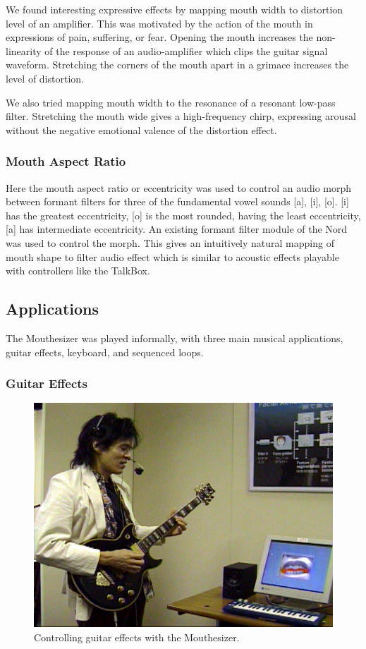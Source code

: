 We found interesting expressive effects by mapping mouth width to distortion level of an amplifier. This was motivated by the action of the mouth in expressions of pain, suffering, or fear. Opening the mouth increases the non-linearity of the response of an audio-amplifier which clips the guitar signal waveform. Stretching the corners of the mouth apart in a grimace increases the level of distortion.

We also tried mapping mouth width to the resonance of a resonant low-pass filter. Stretching the mouth wide gives a high-frequency chirp, expressing arousal without the negative emotional valence of the distortion effect.

\subsubsection{Mouth Aspect Ratio}

Here the mouth aspect ratio or eccentricity was used to control an audio morph between formant filters for three of the fundamental vowel sounds [a], [i], [o]. [i] has the greatest eccentricity, [o] is the most rounded, having the least eccentricity, [a] has intermediate eccentricity. An existing formant filter module of the Nord was used to control the morph. This gives an intuitively natural mapping of mouth shape to filter audio effect which is similar to acoustic effects playable with controllers like the TalkBox.

\subsection{Applications}

The Mouthesizer was played informally, with three main musical applications, guitar effects, keyboard, and sequenced loops.

\subsubsection{Guitar Effects}

\begin{figure}[t]
\centering
\includegraphics[width=\textwidth]{lyons_fig5}
\caption{Controlling guitar effects with the Mouthesizer.}
\label{lyons-fig:5} 
\end{figure}

